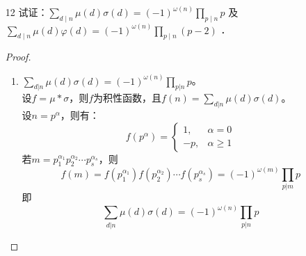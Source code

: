 \begin{enumerate}
\begin{proof}
\begin{enumerate}
            \item 设$g=\mu d * u$，则$g$为积性函数，且$g(n)=\sum\limits_{t|n}\mu(t)d(t)$。\\
            设$n=p^\alpha$，则有：
            \[g(p^\alpha)=\begin{cases}
                1, & \alpha=0\\
                -1, & \alpha\geq 1
            \end{cases}\]
            若$m=p_1^{\alpha_1}p_2^{\alpha_2}\cdots p_s^{\alpha_s}$，则
            \[g(m)=g(p_1^{\alpha_1})g(p_2^{\alpha_2})\cdots g(p_s^{\alpha_s})=(-1)^{\omega(m)}\]
            即
            \[\sum\limits_{t|n}\mu(t)d(t)=(-1)^{\omega(n)}\]
        \end{enumerate}
    \end{proof}
    \item[12] 试证：$\sum_{d \mid n} \mu(d) \sigma(d)=(-1)^{\omega(n)} \prod_{p \mid n} p$ 及 $\sum_{d \mid n} \mu(d) \varphi(d)=(-1)^{\omega(n)} \prod_{p \mid n}(p-2)$ ．
    \begin{proof}
        \begin{enumerate}
            \item $\sum\limits_{d|n}\mu(d)\sigma(d)=(-1)^{\omega(n)}\prod\limits_{p|n}p$。\\
            设$f=\mu*\sigma$，则$f$为积性函数，且$f(n)=\sum\limits_{d|n}\mu(d)\sigma(d)$。\\
            设$n=p^\alpha$，则有：
            \[f(p^\alpha)=\begin{cases}
                1, & \alpha=0\\
                -p, & \alpha\geq 1
            \end{cases}\]
            若$m=p_1^{\alpha_1}p_2^{\alpha_2}\cdots p_s^{\alpha_s}$，则
            \[f(m)=f(p_1^{\alpha_1})f(p_2^{\alpha_2})\cdots f(p_s^{\alpha_s})=(-1)^{\omega(m)}\prod\limits_{p|m}p\]
            即
            \[\sum\limits_{d|n}\mu(d)\sigma(d)=(-1)^{\omega(n)}\prod\limits_{p|n}p\]
            

\end{enumerate}
\end{proof}
\end{enumerate}
